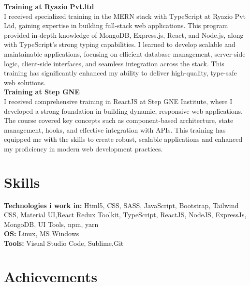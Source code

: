 \documentclass[letterpaper, 11pt]{article}
\newcommand{\secStartSpace}{\vspace{3pt}}
\newcommand{\secEndSpace}{\vspace{5pt}}
\begin{document}
\begin{addmargin}[1em]{1em}
\noindent \textbf{Training at Ryazio Pvt.ltd} 
\\
I received specialized training in the MERN stack with TypeScript at Ryazio Pvt Ltd, gaining expertise in building full-stack web applications. This program provided in-depth knowledge of MongoDB, Express.js, React, and Node.js, along with TypeScript's strong typing capabilities. I learned to develop scalable and maintainable applications, focusing on efficient database management, server-side logic, client-side interfaces, and seamless integration across the stack. This training has significantly enhanced my ability to deliver high-quality, type-safe web solutions.
\\
\noindent \textbf{Training at Step GNE} 
\\
I received comprehensive training in ReactJS at Step GNE Institute, where I developed a strong foundation in building dynamic, responsive web applications. The course covered key concepts such as component-based architecture, state management, hooks, and effective integration with APIs. This training has equipped me with the skills to create robust, scalable applications and enhanced my proficiency in modern web development practices.
\end{addmargin}
\secEndSpace

\section{\color{blue} \textbf{Skills}}
\secStartSpace

\begin{addmargin}[1em]{1em}
	\noindent \textbf{Technologies i work in:} Html5, CSS, SASS, JavaScript, Bootstrap, Tailwind CSS, Material UI,React Redux Toolkit, TypeScript, ReactJS, NodeJS, ExpressJs, MongoDB, UI Tools, npm, yarn \\
	\noindent \textbf{OS:} Linux, MS Windows\\
	\noindent \textbf{Tools:} Visual Studio Code, Sublime,Git
\end{addmargin}
\secEndSpace


\section{\color{blue} \textbf{Achievements}}
\secStartSpace
\end{document}
